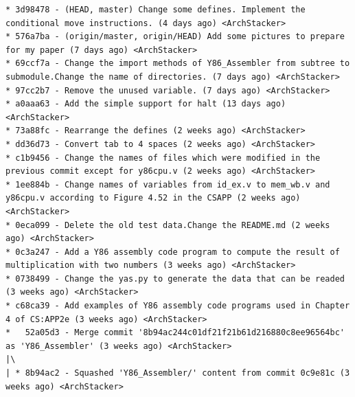 \documentclass[12pt]{article}
\begin{document}
\begin{CJK*}{GB}{gbsn}
\begin{verbatim}
* 3d98478 - (HEAD, master) Change some defines. Implement the conditional move instructions. (4 days ago) <ArchStacker>                                                 
* 576a7ba - (origin/master, origin/HEAD) Add some pictures to prepare for my paper (7 days ago) <ArchStacker>                                                           
* 69ccf7a - Change the import methods of Y86_Assembler from subtree to submodule.Change the name of directories. (7 days ago) <ArchStacker>                             
* 97cc2b7 - Remove the unused variable. (7 days ago) <ArchStacker>                                                                                                      
* a0aaa63 - Add the simple support for halt (13 days ago) <ArchStacker>                                                                                                 
* 73a88fc - Rearrange the defines (2 weeks ago) <ArchStacker>                                                                                                           
* dd36d73 - Convert tab to 4 spaces (2 weeks ago) <ArchStacker>                                                                                                         
* c1b9456 - Change the names of files which were modified in the previous commit except for y86cpu.v (2 weeks ago) <ArchStacker>                                        
* 1ee884b - Change names of variables from id_ex.v to mem_wb.v and y86cpu.v according to Figure 4.52 in the CSAPP (2 weeks ago) <ArchStacker>                           
* 0eca099 - Delete the old test data.Change the README.md (2 weeks ago) <ArchStacker>                                                                                   
* 0c3a247 - Add a Y86 assembly code program to compute the result of multiplication with two numbers (3 weeks ago) <ArchStacker>                                        
* 0738499 - Change the yas.py to generate the data that can be readed (3 weeks ago) <ArchStacker>                                                                       
* c68ca39 - Add examples of Y86 assembly code programs used in Chapter 4 of CS:APP2e (3 weeks ago) <ArchStacker>                                                        
*   52a05d3 - Merge commit '8b94ac244c01df21f21b61d216880c8ee96564bc' as 'Y86_Assembler' (3 weeks ago) <ArchStacker>                                                    
|\                                                                                                                                                                      
| * 8b94ac2 - Squashed 'Y86_Assembler/' content from commit 0c9e81c (3 weeks ago) <ArchStacker>                                                                         

\end{verbatim}
\end{CJK*}
\end{document}
